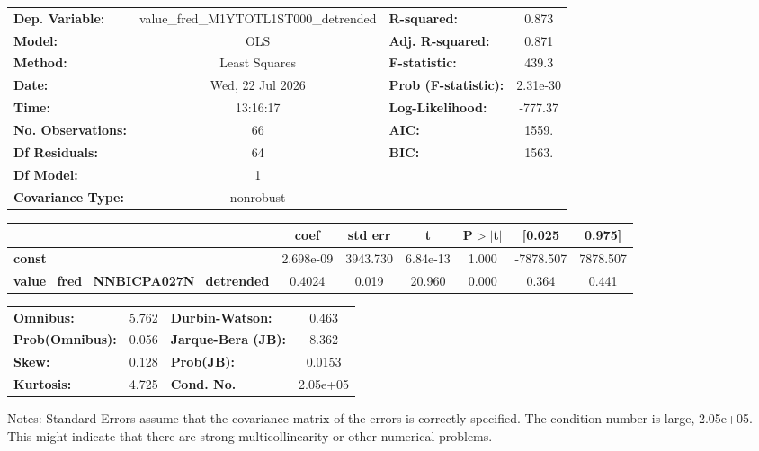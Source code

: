 \begin{center}
\begin{tabular}{lclc}
\toprule
\textbf{Dep. Variable:}                      & value\_fred\_M1YTOTL1ST000\_detrended & \textbf{  R-squared:         } &     0.873   \\
\textbf{Model:}                              &                  OLS                  & \textbf{  Adj. R-squared:    } &     0.871   \\
\textbf{Method:}                             &             Least Squares             & \textbf{  F-statistic:       } &     439.3   \\
\textbf{Date:}                               &            Wed, 22 Jul 2026           & \textbf{  Prob (F-statistic):} &  2.31e-30   \\
\textbf{Time:}                               &                13:16:17               & \textbf{  Log-Likelihood:    } &   -777.37   \\
\textbf{No. Observations:}                   &                     66                & \textbf{  AIC:               } &     1559.   \\
\textbf{Df Residuals:}                       &                     64                & \textbf{  BIC:               } &     1563.   \\
\textbf{Df Model:}                           &                      1                & \textbf{                     } &             \\
\textbf{Covariance Type:}                    &               nonrobust               & \textbf{                     } &             \\
\bottomrule
\end{tabular}
\begin{tabular}{lcccccc}
                                             & \textbf{coef} & \textbf{std err} & \textbf{t} & \textbf{P$> |$t$|$} & \textbf{[0.025} & \textbf{0.975]}  \\
\midrule
\textbf{const}                               &    2.698e-09  &     3943.730     &  6.84e-13  &         1.000        &    -7878.507    &     7878.507     \\
\textbf{value\_fred\_NNBICPA027N\_detrended} &       0.4024  &        0.019     &    20.960  &         0.000        &        0.364    &        0.441     \\
\bottomrule
\end{tabular}
\begin{tabular}{lclc}
\textbf{Omnibus:}       &  5.762 & \textbf{  Durbin-Watson:     } &    0.463  \\
\textbf{Prob(Omnibus):} &  0.056 & \textbf{  Jarque-Bera (JB):  } &    8.362  \\
\textbf{Skew:}          &  0.128 & \textbf{  Prob(JB):          } &   0.0153  \\
\textbf{Kurtosis:}      &  4.725 & \textbf{  Cond. No.          } & 2.05e+05  \\
\bottomrule
\end{tabular}
\end{center}

Notes: \newline
 [1] Standard Errors assume that the covariance matrix of the errors is correctly specified. \newline
 [2] The condition number is large, 2.05e+05. This might indicate that there are \newline
 strong multicollinearity or other numerical problems.